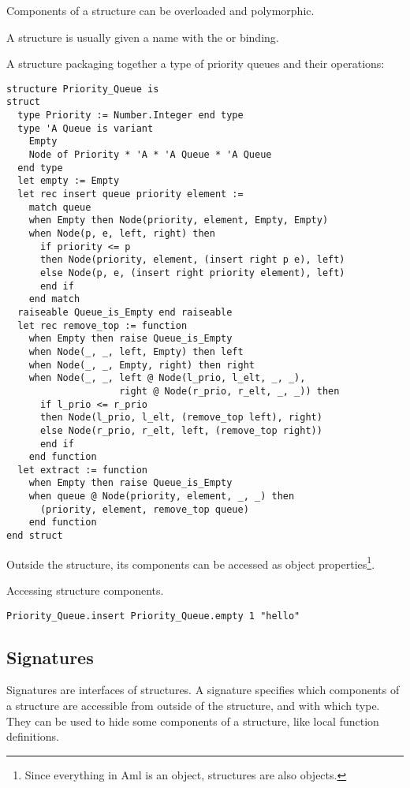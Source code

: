 Components of a structure can be overloaded and polymorphic. 

A structure is usually given a name with the  or  binding. 

\example A structure packaging together a type of priority queues and their operations:
\begin{lstlisting}
structure Priority_Queue is
struct
  type Priority := Number.Integer end type
  type 'A Queue is variant 
    Empty
    Node of Priority * 'A * 'A Queue * 'A Queue
  end type
  let empty := Empty
  let rec insert queue priority element :=
    match queue
    when Empty then Node(priority, element, Empty, Empty)
    when Node(p, e, left, right) then
      if priority <= p
      then Node(priority, element, (insert right p e), left)
      else Node(p, e, (insert right priority element), left)
      end if
    end match
  raiseable Queue_is_Empty end raiseable
  let rec remove_top := function
    when Empty then raise Queue_is_Empty
    when Node(_, _, left, Empty) then left
    when Node(_, _, Empty, right) then right
    when Node(_, _, left @ Node(l_prio, l_elt, _, _), 
                    right @ Node(r_prio, r_elt, _, _)) then
      if l_prio <= r_prio
      then Node(l_prio, l_elt, (remove_top left), right)
      else Node(r_prio, r_elt, left, (remove_top right))
      end if
    end function
  let extract := function
    when Empty then raise Queue_is_Empty
    when queue @ Node(priority, element, _, _) then
      (priority, element, remove_top queue)
    end function
end struct
\end{lstlisting}

Outside the structure, its components can be accessed as object properties\footnote{Since everything in Aml is an object, structures are also objects.}. 

\example Accessing structure components.
\begin{lstlisting}
Priority_Queue.insert Priority_Queue.empty 1 "hello"
\end{lstlisting}






\subsection{Signatures}

Signatures are interfaces of structures. A signature specifies which components of a structure are accessible from outside of the structure, and with which type. They can be used to hide some components of a structure, like local function definitions. 

